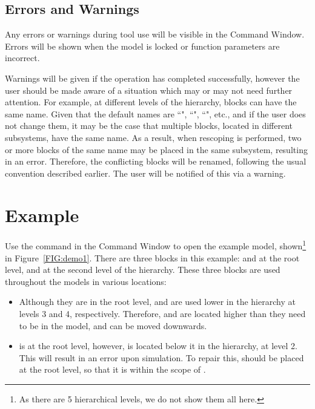 \documentclass{article}
\makeatletter
\newcommand{\demoName}{\cmd{DataStoreRescopeDemo}\@\xspace}
\makeatother
\begin{document}
\subsection{Errors and Warnings}
Any errors or warnings during tool use will be visible in the \matlab Command Window. Errors will be shown when the model is locked or function parameters are incorrect.  

Warnings will be given if the operation has completed successfully, however the user should be made aware of a situation which may or may not need further attention. For example, at different levels of the hierarchy, \DSM blocks can have the same name. Given that the default names  are ``", ``", ``", etc., and if the user does not change them, it may be the case that multiple \DSM blocks, located in different subsystems, have the same name. As a result, when rescoping is performed, two or more \DSM blocks of the same name may be placed in the same subsystem, resulting in an error. Therefore, the conflicting blocks will be renamed, following the usual \Simulink convention described earlier. The user will be notified of this via a warning.

\clearpage
\section{Example}

Use the command \demoName in the \Simulink Command Window to open the example model, shown\footnote{As there are 5 hierarchical levels, we do not show them all here.} in Figure~\ref{FIG:demo1}. There are three \DSM blocks in this example:  and  at the root level, and  at the second level of the hierarchy. These three \DSM blocks are used throughout the models in various locations:

\begin{itemize}
	\item Although they are in the root level,  and  are used lower in the hierarchy at levels 3 and 4, respectively. Therefore, \DSM {} and  are located higher than they need to be in the model, and can be moved downwards.
	\item \DSW {} is at the root level, however, \DSM {} is located below it in the hierarchy, at level 2. This will result in an error upon simulation. To repair this, \DSM {} should be placed at the root level, so that it is within the scope of \DSW {}.
\end{itemize}
\end{document}
